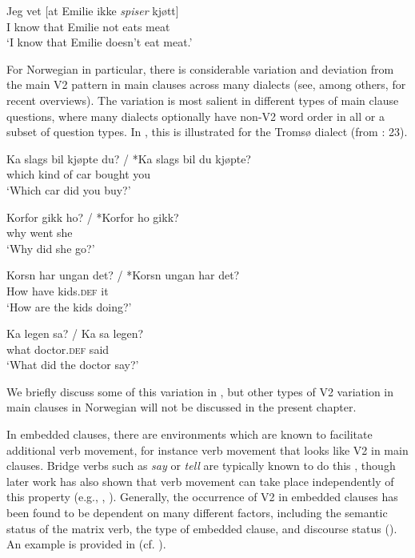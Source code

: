\documentclass[output=paper]{langscibook}
\begin{document}
\ea%
    \label{ex:anderssen:4}
    \gll Jeg vet    [at    Emilie ikke \textit{spiser} kjøtt]\\
  I     know that Emilie not   eats    meat\\
\glt  ‘I know that Emilie doesn’t eat meat.’
\z

For Norwegian in particular, there is considerable variation and deviation from the main V2 pattern in main clauses across many dialects (see, among others, \citealt{Westergaard2009Acquisition, WestergaardVangsnesLohndal2017, LohndalWestergaardVangsnes2020, Westendorp2021} for recent overviews). The variation is most salient in different types of main clause questions, where many dialects optionally have non-V2 word order in all or a subset of question types. In , this is illustrated for the Tromsø dialect (from \citealt{Westergaard2009Acquisition}: 23).

\ea%
    \label{ex:anderssen:5}
\ea \gll Ka slags bil  kjøpte du? / *Ka slags bil du kjøpte?\\
which {kind of}   car bought you\\
\glt ‘Which car did you buy?’

\ex  \gll Korfor gikk  ho? / *Korfor ho gikk?\\
why     went she\\
\glt ‘Why did she go?’

\ex  \gll Korsn har   ungan         det? / *Korsn ungan har det?\\
		  How    have kids.\textsc{def}  it\\
\glt ‘How are the kids doing?’

\ex  \gll Ka    legen         sa? / Ka sa legen?\\
what doctor.\textsc{def} said\\
\glt ‘What did the doctor say?’
\z
\z

We briefly discuss some of this variation in , but other types of V2 variation in main clauses in Norwegian will not be discussed in the present chapter.

In embedded clauses, there are environments which are known to facilitate additional verb movement, for instance verb movement that looks like V2 in main clauses. Bridge verbs such as \textit{say} or \textit{tell} are typically known to do this \citep{Vikner1995}, though later work has also shown that verb movement can take place independently of this property (e.g., \citealt{Bentzen2007}, \citealt{WiklundEtAl2009}). Generally, the occurrence of V2 in embedded clauses has been found to be dependent on many different factors, including the semantic status of the matrix verb, the type of embedded clause, and discourse status (\citealt{Heycock2006, WiklundEtAl2009, Julien2007,Julien2015, Bentzen2014, Ringstad2019}). An example is provided in  (cf. ).
\end{document}
